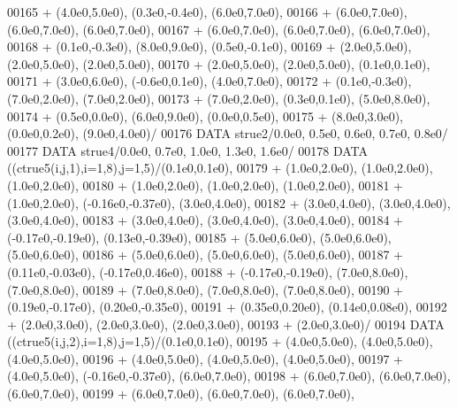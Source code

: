 \begin{DoxyCode}
00165      +                  (4.0e0,5.0e0), (0.3e0,-0.4e0), (6.0e0,7.0e0),
00166      +                  (6.0e0,7.0e0), (6.0e0,7.0e0), (6.0e0,7.0e0),
00167      +                  (6.0e0,7.0e0), (6.0e0,7.0e0), (6.0e0,7.0e0),
00168      +                  (0.1e0,-0.3e0), (8.0e0,9.0e0), (0.5e0,-0.1e0),
00169      +                  (2.0e0,5.0e0), (2.0e0,5.0e0), (2.0e0,5.0e0),
00170      +                  (2.0e0,5.0e0), (2.0e0,5.0e0), (0.1e0,0.1e0),
00171      +                  (3.0e0,6.0e0), (-0.6e0,0.1e0), (4.0e0,7.0e0),
00172      +                  (0.1e0,-0.3e0), (7.0e0,2.0e0), (7.0e0,2.0e0),
00173      +                  (7.0e0,2.0e0), (0.3e0,0.1e0), (5.0e0,8.0e0),
00174      +                  (0.5e0,0.0e0), (6.0e0,9.0e0), (0.0e0,0.5e0),
00175      +                  (8.0e0,3.0e0), (0.0e0,0.2e0), (9.0e0,4.0e0)/
00176       \textcolor{keyword}{DATA}              strue2/0.0e0, 0.5e0, 0.6e0, 0.7e0, 0.8e0/
00177       \textcolor{keyword}{DATA}              strue4/0.0e0, 0.7e0, 1.0e0, 1.3e0, 1.6e0/
00178       \textcolor{keyword}{DATA}              ((ctrue5(i,j,1),i=1,8),j=1,5)/(0.1e0,0.1e0),
00179      +                  (1.0e0,2.0e0), (1.0e0,2.0e0), (1.0e0,2.0e0),
00180      +                  (1.0e0,2.0e0), (1.0e0,2.0e0), (1.0e0,2.0e0),
00181      +                  (1.0e0,2.0e0), (-0.16e0,-0.37e0), (3.0e0,4.0e0),
00182      +                  (3.0e0,4.0e0), (3.0e0,4.0e0), (3.0e0,4.0e0),
00183      +                  (3.0e0,4.0e0), (3.0e0,4.0e0), (3.0e0,4.0e0),
00184      +                  (-0.17e0,-0.19e0), (0.13e0,-0.39e0),
00185      +                  (5.0e0,6.0e0), (5.0e0,6.0e0), (5.0e0,6.0e0),
00186      +                  (5.0e0,6.0e0), (5.0e0,6.0e0), (5.0e0,6.0e0),
00187      +                  (0.11e0,-0.03e0), (-0.17e0,0.46e0),
00188      +                  (-0.17e0,-0.19e0), (7.0e0,8.0e0), (7.0e0,8.0e0),
00189      +                  (7.0e0,8.0e0), (7.0e0,8.0e0), (7.0e0,8.0e0),
00190      +                  (0.19e0,-0.17e0), (0.20e0,-0.35e0),
00191      +                  (0.35e0,0.20e0), (0.14e0,0.08e0),
00192      +                  (2.0e0,3.0e0), (2.0e0,3.0e0), (2.0e0,3.0e0),
00193      +                  (2.0e0,3.0e0)/
00194       \textcolor{keyword}{DATA}              ((ctrue5(i,j,2),i=1,8),j=1,5)/(0.1e0,0.1e0),
00195      +                  (4.0e0,5.0e0), (4.0e0,5.0e0), (4.0e0,5.0e0),
00196      +                  (4.0e0,5.0e0), (4.0e0,5.0e0), (4.0e0,5.0e0),
00197      +                  (4.0e0,5.0e0), (-0.16e0,-0.37e0), (6.0e0,7.0e0),
00198      +                  (6.0e0,7.0e0), (6.0e0,7.0e0), (6.0e0,7.0e0),
00199      +                  (6.0e0,7.0e0), (6.0e0,7.0e0), (6.0e0,7.0e0),

\end{DoxyCode}
